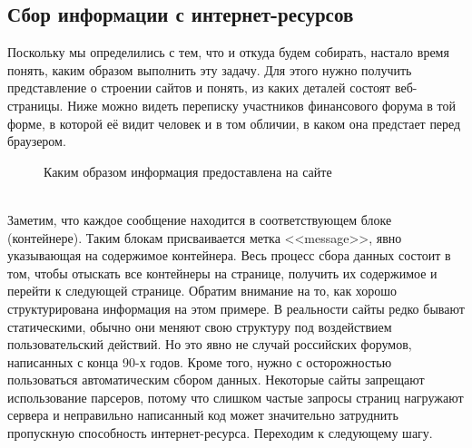 \documentclass{article}
\begin{document}
\subsection{Сбор информации с интернет-ресурсов}
Поскольку мы определились с тем, что и откуда будем собирать, настало время понять, каким образом выполнить эту задачу. Для этого нужно получить представление о строении сайтов и понять, из каких деталей состоят веб-страницы. Ниже можно видеть переписку участников финансового форума в той форме, в которой её видит человек и в том обличии, в каком она предстает перед браузером. 
\begin{figure}[h]
	\caption{Каким образом информация предоставлена на сайте}
	\label{fig:image}
\end{figure} \\
Заметим, что каждое сообщение находится в соответствующем блоке (контейнере). Таким блокам присваивается метка <<message>>, явно указывающая на содержимое контейнера. Весь процесс сбора данных состоит в том, чтобы отыскать все контейнеры на странице, получить их содержимое и перейти к следующей странице. Обратим внимание на то, как хорошо структурирована информация на этом примере. В реальности сайты редко бывают статическими, обычно они меняют свою структуру под воздействием пользовательский действий. Но это явно не случай российских форумов, написанных с конца 90-х годов. Кроме того, нужно с осторожностью пользоваться автоматическим сбором данных. Некоторые сайты запрещают использование парсеров, потому что слишком частые запросы страниц нагружают сервера и неправильно написанный код может значительно затруднить пропускную способность интернет-ресурса. Переходим к следующему шагу. \\
\end{document}
